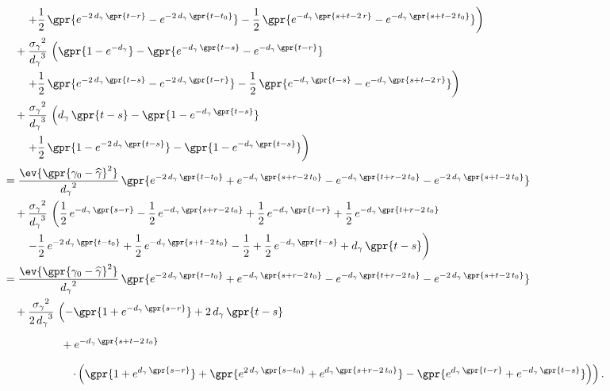 \begin{align}
    		&\qquad \left. + \frac{1}{2}\,\gpr{e^{-2\,d_{\gamma}\,\gpr{t - r}} - e^{-2\,d_{\gamma}\,\gpr{t - t_0}}} - \frac{1}{2}\,\gpr{e^{-d_{\gamma}\,\gpr{s + t - 2\,r}} - e^{-d_{\gamma}\,\gpr{s + t - 2\,t_0}}} \right) \nonumber \\
    		&\quad + \frac{{\sigma_{\gamma}}^2}{{d_{\gamma}}^{3}}\,\left( \gpr{1 - e^{-d_{\gamma}}} - \gpr{e^{-d_{\gamma}\,\gpr{t - s}} - e^{-d_{\gamma}\,\gpr{t - r}}} \right. \nonumber \\
    		&\qquad \left. + \frac{1}{2}\,\gpr{e^{-2\,d_{\gamma}\,\gpr{t - s}}  - e^{-2\,d_{\gamma}\,\gpr{t - r}}} - \frac{1}{2}\,\gpr{e^{-d_{\gamma}\,\gpr{t - s}} - e^{-d_{\gamma}\,\gpr{s + t - 2\,r}}} \right) \nonumber \\
    		&\quad + \frac{{\sigma_{\gamma}}^2}{{d_{\gamma}}^{3}}\,\left( d_{\gamma}\,\gpr{t - s} - \gpr{1 - e^{-d_{\gamma}\,\gpr{t - s}}} \right. \nonumber \\
    		&\qquad \left. + \frac{1}{2}\,\gpr{1 - e^{-2\,d_{\gamma}\,\gpr{t - s}}} - \gpr{1 - e^{-d_{\gamma}\,\gpr{t - s}}} \right) \nonumber \\
    	&= \frac{\ev{\gpr{\gamma_0 - \widehat{\gamma}}^2}}{{d_{\gamma}}^2}\,\gpr{e^{-2\,d_{\gamma}\,\gpr{t - t_0}} + e^{-d_{\gamma}\,\gpr{s + r - 2\,t_0}} - e^{-d_{\gamma}\,\gpr{t + r - 2\,t_0}} - e^{-2\,d_{\gamma}\,\gpr{s + t - 2\,t_0}}}  \nonumber \\
    		&\quad + \frac{{\sigma_{\gamma}}^2}{{d_{\gamma}}^{3}}\,\left(\frac{1}{2}\,e^{-d_{\gamma}\,\gpr{s - r}} - \frac{1}{2}\,e^{-d_{\gamma}\,\gpr{s + r - 2\,t_0}}  + \frac{1}{2}\,e^{-d_{\gamma}\,\gpr{t - r}} + \frac{1}{2}\,e^{-d_{\gamma}\,\gpr{t + r - 2\,t_0}} \right. \nonumber \\
    		&\qquad \left. - \frac{1}{2}\,e^{-2\,d_{\gamma}\,\gpr{t - t_0}} + \frac{1}{2}\,e^{-d_{\gamma}\,\gpr{s + t - 2\,t_0}} - \frac{1}{2} + \frac{1}{2}\,e^{-d_{\gamma}\,\gpr{t - s}} + d_{\gamma}\,\gpr{t - s} \right) \nonumber \\
    	&= \frac{\ev{\gpr{\gamma_0 - \widehat{\gamma}}^2}}{{d_{\gamma}}^2}\,\gpr{e^{-2\,d_{\gamma}\,\gpr{t - t_0}} + e^{-d_{\gamma}\,\gpr{s + r - 2\,t_0}} - e^{-d_{\gamma}\,\gpr{t + r - 2\,t_0}} - e^{-2\,d_{\gamma}\,\gpr{s + t - 2\,t_0}}}  \nonumber \\
    		&\quad + \frac{{\sigma_{\gamma}}^2}{{2\,d_{\gamma}}^{3}}\,\left( -\gpr{1 + e^{-d_{\gamma}\,\gpr{s - r}}} + 2\,d_{\gamma}\,\gpr{t - s} \right. \nonumber \\
    		&\phantom{+ \frac{{\sigma_{\gamma}}^2}{{2\,d_{\gamma}}^{3}}}\qquad + e^{-d_{\gamma}\,\gpr{s + t - 2\,t_0}} \nonumber \\
    		&\qquad\qquad\qquad  \left. \cdot \left( \gpr{1 + e^{d_{\gamma}\,\gpr{s - r}}} + \gpr{e^{2\,d_{\gamma}\,\gpr{s - t_0}} + e^{d_{\gamma}\,\gpr{s + r - 2\,t_0}}} - \gpr{e^{d_{\gamma}\,\gpr{t - r}} + e^{-d_{\gamma}\,\gpr{t - s}}} \right) \right).
\end{align}


